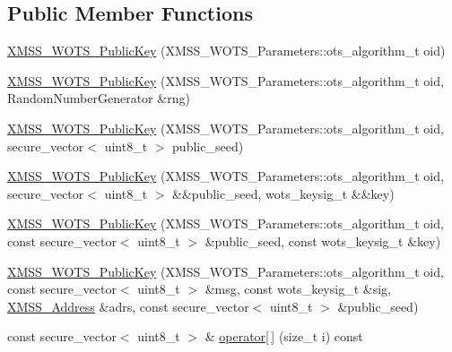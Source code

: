 \subsection*{Public Member Functions}
\begin{DoxyCompactItemize}
\item 
\mbox{\hyperlink{class_botan_1_1_x_m_s_s___w_o_t_s___public_key_a7fb721c64c4e4e95d7b253e24942dfe0}{X\+M\+S\+S\+\_\+\+W\+O\+T\+S\+\_\+\+Public\+Key}} (X\+M\+S\+S\+\_\+\+W\+O\+T\+S\+\_\+\+Parameters\+::ots\+\_\+algorithm\+\_\+t oid)
\item 
\mbox{\hyperlink{class_botan_1_1_x_m_s_s___w_o_t_s___public_key_a3fb0d9f974c41f2be8c5e14a0ad39403}{X\+M\+S\+S\+\_\+\+W\+O\+T\+S\+\_\+\+Public\+Key}} (X\+M\+S\+S\+\_\+\+W\+O\+T\+S\+\_\+\+Parameters\+::ots\+\_\+algorithm\+\_\+t oid, Random\+Number\+Generator \&rng)
\item 
\mbox{\hyperlink{class_botan_1_1_x_m_s_s___w_o_t_s___public_key_a99e8be1233998e9375321051722fa40e}{X\+M\+S\+S\+\_\+\+W\+O\+T\+S\+\_\+\+Public\+Key}} (X\+M\+S\+S\+\_\+\+W\+O\+T\+S\+\_\+\+Parameters\+::ots\+\_\+algorithm\+\_\+t oid, secure\+\_\+vector$<$ uint8\+\_\+t $>$ public\+\_\+seed)
\item 
\mbox{\hyperlink{class_botan_1_1_x_m_s_s___w_o_t_s___public_key_a107a21510470543ddb752834e8f08594}{X\+M\+S\+S\+\_\+\+W\+O\+T\+S\+\_\+\+Public\+Key}} (X\+M\+S\+S\+\_\+\+W\+O\+T\+S\+\_\+\+Parameters\+::ots\+\_\+algorithm\+\_\+t oid, secure\+\_\+vector$<$ uint8\+\_\+t $>$ \&\&public\+\_\+seed, wots\+\_\+keysig\+\_\+t \&\&key)
\item 
\mbox{\hyperlink{class_botan_1_1_x_m_s_s___w_o_t_s___public_key_a779c569407ba1dfd3d196a163655d45f}{X\+M\+S\+S\+\_\+\+W\+O\+T\+S\+\_\+\+Public\+Key}} (X\+M\+S\+S\+\_\+\+W\+O\+T\+S\+\_\+\+Parameters\+::ots\+\_\+algorithm\+\_\+t oid, const secure\+\_\+vector$<$ uint8\+\_\+t $>$ \&public\+\_\+seed, const wots\+\_\+keysig\+\_\+t \&key)
\item 
\mbox{\hyperlink{class_botan_1_1_x_m_s_s___w_o_t_s___public_key_a79d8a0be458add3ecdc137f7556b1b80}{X\+M\+S\+S\+\_\+\+W\+O\+T\+S\+\_\+\+Public\+Key}} (X\+M\+S\+S\+\_\+\+W\+O\+T\+S\+\_\+\+Parameters\+::ots\+\_\+algorithm\+\_\+t oid, const secure\+\_\+vector$<$ uint8\+\_\+t $>$ \&msg, const wots\+\_\+keysig\+\_\+t \&sig, \mbox{\hyperlink{class_botan_1_1_x_m_s_s___address}{X\+M\+S\+S\+\_\+\+Address}} \&adrs, const secure\+\_\+vector$<$ uint8\+\_\+t $>$ \&public\+\_\+seed)
\item 
const secure\+\_\+vector$<$ uint8\+\_\+t $>$ \& \mbox{\hyperlink{class_botan_1_1_x_m_s_s___w_o_t_s___public_key_ae4e237a93bd043f4b34e02c03bfa1559}{operator\mbox{[}$\,$\mbox{]}}} (size\+\_\+t i) const

\end{DoxyCompactItemize}
